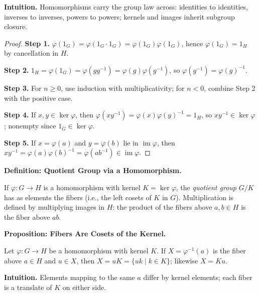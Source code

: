 \documentclass[9pt]{article}
\theoremstyle{definition}
\begin{document}
\dotfill

\noindent\textbf{Intuition.}
Homomorphisms carry the group law across: identities to identities, inverses to inverses, powers to powers; kernels and images inherit subgroup closure.

\dotfill

\begin{proof}
\textbf{Step 1.} $\varphi(1_G)=\varphi(1_G\cdot 1_G)=\varphi(1_G)\varphi(1_G)$, hence $\varphi(1_G)=1_H$ by cancellation in $H$.

\textbf{Step 2.} $1_H=\varphi(1_G)=\varphi(gg^{-1})=\varphi(g)\varphi(g^{-1})$, so $\varphi(g^{-1})=\varphi(g)^{-1}$.

\textbf{Step 3.} For $n\ge0$, use induction with multiplicativity; for $n<0$, combine Step 2 with the positive case.

\textbf{Step 4.} If $x,y\in\ker\varphi$, then $\varphi(xy^{-1})=\varphi(x)\varphi(y)^{-1}=1_H$, so $xy^{-1}\in\ker\varphi$; nonempty since $1_G\in\ker\varphi$.

\textbf{Step 5.} If $x=\varphi(a)$ and $y=\varphi(b)$ lie in $\operatorname{im}\varphi$, then $xy^{-1}=\varphi(a)\varphi(b)^{-1}=\varphi(ab^{-1})\in\operatorname{im}\varphi$.
\end{proof}

\newpage

\noindent\textbf{Definition: Quotient Group via a Homomorphism.}

\newpage

If $\varphi:G\to H$ is a homomorphism with kernel $K=\ker\varphi$, the \emph{quotient group} $G/K$ has as elements the fibers (i.e., the left cosets of $K$ in $G$). Multiplication is defined by multiplying images in $H$: the product of the fibers above $a,b\in H$ is the fiber above $ab$.

\newpage

\noindent\textbf{Proposition: Fibers Are Cosets of the Kernel.}

\newpage

Let $\varphi:G\to H$ be a homomorphism with kernel $K$. If $X=\varphi^{-1}(a)$ is the fiber above $a\in H$ and $u\in X$, then $X=uK=\{uk\mid k\in K\}$; likewise $X=Ku$.

\dotfill

\noindent\textbf{Intuition.}
Elements mapping to the same $a$ differ by kernel elements; each fiber is a translate of $K$ on either side.
\end{document}

